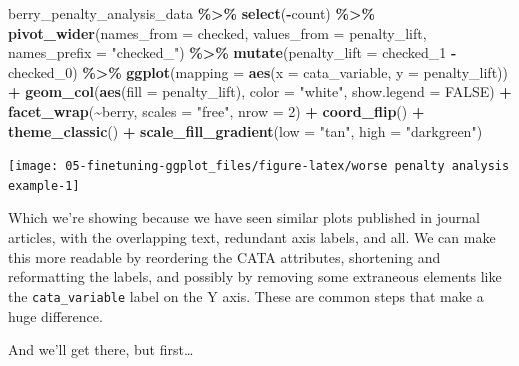 \documentclass[
]{book}
\newenvironment{Shaded}{\begin{snugshade}}{\end{snugshade}}
\newcommand{\AttributeTok}[1]{\textcolor[rgb]{0.13,0.29,0.53}{#1}}
\newcommand{\ConstantTok}[1]{\textcolor[rgb]{0.56,0.35,0.01}{#1}}
\newcommand{\DecValTok}[1]{\textcolor[rgb]{0.00,0.00,0.81}{#1}}
\newcommand{\FunctionTok}[1]{\textcolor[rgb]{0.13,0.29,0.53}{\textbf{#1}}}
\newcommand{\NormalTok}[1]{#1}
\newcommand{\SpecialCharTok}[1]{\textcolor[rgb]{0.81,0.36,0.00}{\textbf{#1}}}
\newcommand{\StringTok}[1]{\textcolor[rgb]{0.31,0.60,0.02}{#1}}
\begin{document}
\begin{Shaded}
\begin{Highlighting}[]
\NormalTok{berry\_penalty\_analysis\_data }\SpecialCharTok{\%\textgreater{}\%}
  \FunctionTok{select}\NormalTok{(}\SpecialCharTok{{-}}\NormalTok{count) }\SpecialCharTok{\%\textgreater{}\%}
  \FunctionTok{pivot\_wider}\NormalTok{(}\AttributeTok{names\_from =}\NormalTok{ checked,}
              \AttributeTok{values\_from =}\NormalTok{ penalty\_lift,}
              \AttributeTok{names\_prefix =} \StringTok{"checked\_"}\NormalTok{) }\SpecialCharTok{\%\textgreater{}\%}
  \FunctionTok{mutate}\NormalTok{(}\AttributeTok{penalty\_lift =}\NormalTok{ checked\_1 }\SpecialCharTok{{-}}\NormalTok{ checked\_0) }\SpecialCharTok{\%\textgreater{}\%}
  \FunctionTok{ggplot}\NormalTok{(}\AttributeTok{mapping =} \FunctionTok{aes}\NormalTok{(}\AttributeTok{x =}\NormalTok{ cata\_variable, }\AttributeTok{y =}\NormalTok{ penalty\_lift)) }\SpecialCharTok{+}
  \FunctionTok{geom\_col}\NormalTok{(}\FunctionTok{aes}\NormalTok{(}\AttributeTok{fill =}\NormalTok{ penalty\_lift), }\AttributeTok{color =} \StringTok{"white"}\NormalTok{, }\AttributeTok{show.legend =} \ConstantTok{FALSE}\NormalTok{) }\SpecialCharTok{+} 
  \FunctionTok{facet\_wrap}\NormalTok{(}\SpecialCharTok{\textasciitilde{}}\NormalTok{berry, }\AttributeTok{scales =} \StringTok{"free"}\NormalTok{, }\AttributeTok{nrow =} \DecValTok{2}\NormalTok{) }\SpecialCharTok{+}
  \FunctionTok{coord\_flip}\NormalTok{() }\SpecialCharTok{+} 
  \FunctionTok{theme\_classic}\NormalTok{() }\SpecialCharTok{+} 
  \FunctionTok{scale\_fill\_gradient}\NormalTok{(}\AttributeTok{low =} \StringTok{"tan"}\NormalTok{, }\AttributeTok{high =} \StringTok{"darkgreen"}\NormalTok{)}
\end{Highlighting}
\end{Shaded}

\begin{center}\texttt{[image: 05-finetuning-ggplot\_files/figure-latex/worse penalty analysis example-1]} \end{center}

Which we're showing because we have seen similar plots published in journal articles, with the overlapping text, redundant axis labels, and all. We can make this more readable by reordering the CATA attributes, shortening and reformatting the labels, and possibly by removing some extraneous elements like the \texttt{cata\_variable} label on the Y axis. These are common steps that make a huge difference.

And we'll get there, but first\ldots{}
\end{document}
